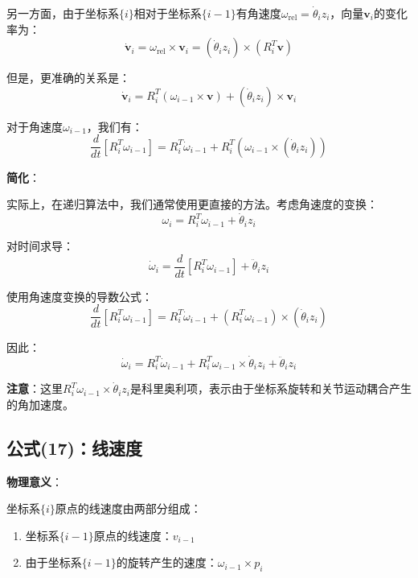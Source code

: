 \documentclass[12pt,a4paper]{article}
\begin{document}
另一方面，由于坐标系$\{i\}$相对于坐标系$\{i-1\}$有角速度$\omega_{\text{rel}} = \dot{\theta}_i z_i$，向量$\mathbf{v}_i$的变化率为：
\begin{equation}
\dot{\mathbf{v}}_i = \omega_{\text{rel}} \times \mathbf{v}_i = (\dot{\theta}_i z_i) \times (R_i^T \mathbf{v})
\end{equation}

但是，更准确的关系是：
\begin{equation}
\dot{\mathbf{v}}_i = R_i^T (\omega_{i-1} \times \mathbf{v}) + (\dot{\theta}_i z_i) \times \mathbf{v}_i
\end{equation}

对于角速度$\omega_{i-1}$，我们有：
\begin{equation}
\frac{d}{dt}[R_i^T \omega_{i-1}] = R_i^T \dot{\omega}_{i-1} + R_i^T (\omega_{i-1} \times (\dot{\theta}_i z_i))
\end{equation}

\textbf{简化}：

实际上，在递归算法中，我们通常使用更直接的方法。考虑角速度的变换：
\begin{equation}
\omega_i = R_i^T \omega_{i-1} + \dot{\theta}_i z_i
\end{equation}

对时间求导：
\begin{equation}
\dot{\omega}_i = \frac{d}{dt}[R_i^T \omega_{i-1}] + \ddot{\theta}_i z_i
\end{equation}

使用角速度变换的导数公式：
\begin{equation}
\frac{d}{dt}[R_i^T \omega_{i-1}] = R_i^T \dot{\omega}_{i-1} + (R_i^T \omega_{i-1}) \times (\dot{\theta}_i z_i)
\end{equation}

因此：
\begin{equation}
\dot{\omega}_i = R_i^T \dot{\omega}_{i-1} + R_i^T \omega_{i-1} \times \dot{\theta}_i z_i + \ddot{\theta}_i z_i \tag{16}
\end{equation}

\textbf{注意}：这里$R_i^T \omega_{i-1} \times \dot{\theta}_i z_i$是科里奥利项，表示由于坐标系旋转和关节运动耦合产生的角加速度。

\subsection{公式(17)：线速度}

\textbf{物理意义}：

坐标系$\{i\}$原点的线速度由两部分组成：
\begin{enumerate}
\item 坐标系$\{i-1\}$原点的线速度：$v_{i-1}$
\item 由于坐标系$\{i-1\}$的旋转产生的速度：$\omega_{i-1} \times p_i$
\end{enumerate}
\end{document}
